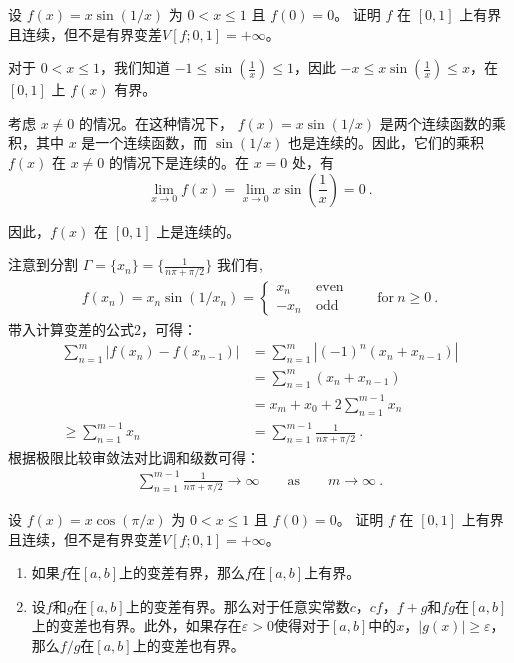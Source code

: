 \begin{example}{设 $f(x)=x\sin\left(1/x\right)$ 为 $0<x\leq1$ 且 $f(0)=0$。 证明 $f$ 在 $[0,1]$ 上有界且连续，但不是有界变差$V[f;0,1]=+\infty$。}

对于 $0 < x \leq 1$，我们知道 $-1 \leq \sin\left(\frac{1}{x}\right) \leq 1$，因此 $-x \leq x\sin\left(\frac{1}{x}\right) \leq x$，在 $[0,1]$ 上 $f(x)$ 有界。

考虑 $x \neq 0$ 的情况。在这种情况下， $f(x) = x \sin(1/x)$ 是两个连续函数的乘积，其中 $x$ 是一个连续函数，而 $\sin(1/x)$ 也是连续的。因此，它们的乘积 $f(x)$ 在 $x \neq 0$ 的情况下是连续的。在 $x = 0$ 处，有
\begin{equation}
\lim_{{x \to 0}} f(x) = \lim_{{x \to 0}} x \sin\left(\frac{1}{x}\right) = 0~.
\end{equation}

因此，$f(x)$ 在 $[0,1]$ 上是连续的。

注意到分割 $\Gamma = \{x_n\}=\{\frac{1}{n\pi+\pi/2}\}$ 我们有,  
\begin{align} f(x_n)=x_n\sin(1/x_n)=\left\{\begin{matrix}x_n& \ \text{even}\\ -x_n& \ \text{odd}\end{matrix}\right.\qquad\text{for}\ n\geq0 ~.
\end{align}
带入计算变差的公式$2$，可得：
\begin{align}
\sum_{n=1}^m|f(x_n)-f(x_{n-1})|&=\sum_{n=1}^m|(-1)^n(x_n+x_{n-1})|\\
&= \sum_{n=1}^m(x_n+x_{n-1})\\&=x_m+x_0+2\sum_{n=1}^{m-1}x_n\\\geq \sum_{n=1}^{m-1} x_n&=\sum_{n=1}^{m-1} \frac{1}{n\pi+\pi/2}~.
\end{align}
根据极限比较审敛法对比调和级数可得：
\begin{align} 
\sum_{n=1}^{m-1}\frac{1}{n\pi+\pi/2}\to\infty\qquad\mathrm{as}\qquad m\to\infty~. 
\end{align}
\end{example}

\begin{exercise}{设 $f(x)=x\cos\left(\pi/x\right)$ 为 $0<x\leq1$ 且 $f(0)=0$。 证明 $f$ 在 $[0,1]$ 上有界且连续，但不是有界变差$V[f;0,1]=+\infty$。}
\end{exercise}

\begin{theorem}{}
\begin{enumerate}
\item 如果$f$在$[a,b]$上的变差有界，那么$f$在$[a,b]$上有界。
\item 设$f$和$g$在$[a,b]$上的变差有界。那么对于任意实常数$c$，$cf$，$f+g$和$fg$在$[a,b]$上的变差也有界。此外，如果存在$\varepsilon>0$使得对于$[a,b]$中的$x$，$|g(x)|\geq\varepsilon$，那么$f/g$在$[a,b]$上的变差也有界。
\end{enumerate}
\end{theorem}

